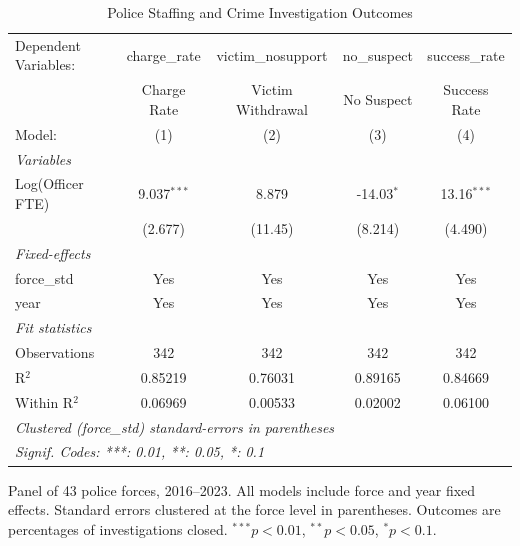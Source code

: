 
\begin{table}[htbp]
   \caption{\label{tab:main} Police Staffing and Crime Investigation Outcomes}
   \centering
   \begin{tabular}{lcccc}
      \tabularnewline \midrule \midrule
      Dependent Variables: & charge\_rate  & victim\_nosupport  & no\_suspect  & success\_rate\\   
                           & Charge Rate   & Victim Withdrawal  & No Suspect   & Success Rate \\   
      Model:               & (1)           & (2)                & (3)          & (4)\\  
      \midrule
      \emph{Variables}\\
      Log(Officer FTE)     & 9.037$^{***}$ & 8.879              & -14.03$^{*}$ & 13.16$^{***}$\\   
                           & (2.677)       & (11.45)            & (8.214)      & (4.490)\\   
      \midrule
      \emph{Fixed-effects}\\
      force\_std           & Yes           & Yes                & Yes          & Yes\\  
      year                 & Yes           & Yes                & Yes          & Yes\\  
      \midrule
      \emph{Fit statistics}\\
      Observations         & 342           & 342                & 342          & 342\\  
      R$^2$                & 0.85219       & 0.76031            & 0.89165      & 0.84669\\  
      Within R$^2$         & 0.06969       & 0.00533            & 0.02002      & 0.06100\\  
      \midrule \midrule
      \multicolumn{5}{l}{\emph{Clustered (force\_std) standard-errors in parentheses}}\\
      \multicolumn{5}{l}{\emph{Signif. Codes: ***: 0.01, **: 0.05, *: 0.1}}\\
   \end{tabular}
   
   \par \raggedright 
   Panel of 43 police forces, 2016--2023. All models include force and year fixed effects. Standard errors clustered at the force level in parentheses. Outcomes are percentages of investigations closed. $^{***}p<0.01$, $^{**}p<0.05$, $^{*}p<0.1$.
\end{table}


